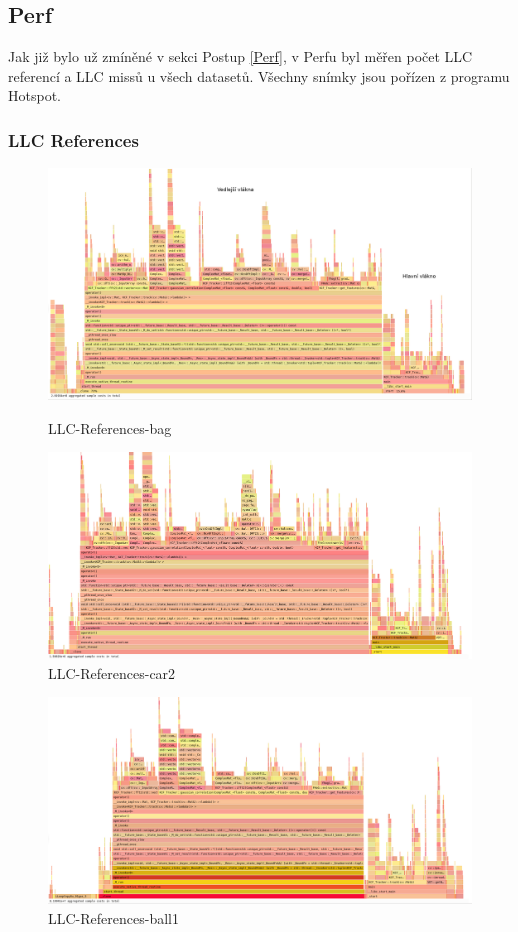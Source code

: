 \documentclass{article}
\begin{document}
\subsection{Perf}
Jak již bylo už zmíněné v sekci Postup \ref{Perf}, v Perfu byl měřen počet LLC referencí a LLC missů u všech datasetů. Všechny snímky jsou pořízen z programu Hotspot.
\subsubsection{LLC References}
\begin{figure}[h!]
	\centering
	\includegraphics[width=\linewidth]{Perf/Bag/LLC-References-bag-whole-gimp.png}
	\caption{LLC-References-bag}
	\label{LLC-References-bag-whole}
	\vspace{0.3cm}
	\centering
	\includegraphics[width=\linewidth]{Perf/car2/LLC-References-car2-whole.png}
	\caption{LLC-References-car2}
	\label{LLC-References-car2-whole}
\end{figure}
\begin{figure}[h!]
	\centering
	\includegraphics[width=\linewidth]{Perf/ball1/LLC-References-ball1-whole.png}
	\caption{LLC-References-ball1}
	\label{LLC-References-ball1-whole}
\end{figure}
\end{document}
